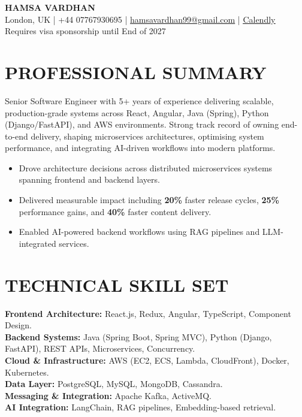 \documentclass[11pt]{article}
\begin{document}
\begin{center}
{\LARGE \textbf{HAMSA VARDHAN}}\\
London, UK \;|\; +44 07767930695 \;|\;
\href{mailto:hamsavardhan99@gmail.com}{hamsavardhan99@gmail.com} \;|\; \href{https://calendly.com/hamsa-vd/intro-call}{\underline{Calendly}} \\
{\small Requires visa sponsorship until End of 2027}
\end{center}

\section*{PROFESSIONAL SUMMARY}

Senior Software Engineer with 5+ years of experience delivering scalable, production-grade systems across React, Angular, Java (Spring), Python (Django/FastAPI), and AWS environments. Strong track record of owning end-to-end delivery, shaping microservices architectures, optimising system performance, and integrating AI-driven workflows into modern platforms.

\begin{itemize}
    \item Drove architecture decisions across distributed microservices systems spanning frontend and backend layers.
    \item Delivered measurable impact including \textbf{20\%} faster release cycles, \textbf{25\%} performance gains, and \textbf{40\%} faster content delivery.
    \item Enabled AI-powered backend workflows using RAG pipelines and LLM-integrated services.
\end{itemize}

\section*{TECHNICAL SKILL SET}

\textbf{Frontend Architecture:} React.js, Redux, Angular, TypeScript, Component Design.\\
\textbf{Backend Systems:} Java (Spring Boot, Spring MVC), Python (Django, FastAPI), REST APIs, Microservices, Concurrency.\\
\textbf{Cloud \& Infrastructure:} AWS (EC2, ECS, Lambda, CloudFront), Docker, Kubernetes.\\
\textbf{Data Layer:} PostgreSQL, MySQL, MongoDB, Cassandra.\\
\textbf{Messaging \& Integration:} Apache Kafka, ActiveMQ.\\
\textbf{AI Integration:} LangChain, RAG pipelines, Embedding-based retrieval.
\end{document}
